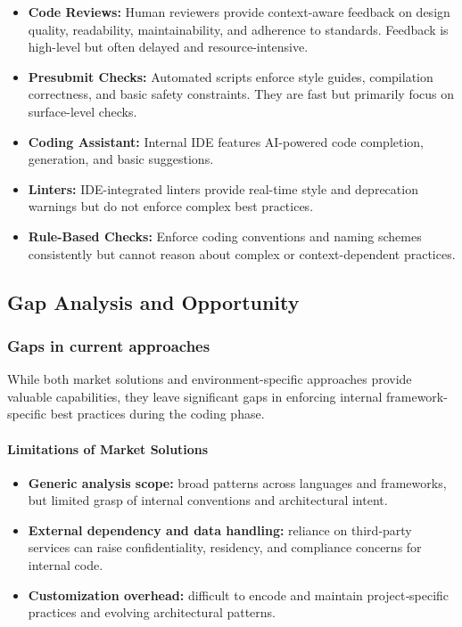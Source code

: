 \begin{spacing}{1.2}
\begin{itemize}
\item \textbf{Code Reviews:} Human reviewers provide context-aware feedback on design quality, readability, maintainability, and adherence to standards. Feedback is high-level but often delayed and resource-intensive.
\item \textbf{Presubmit Checks:} Automated scripts enforce style guides, compilation correctness, and basic safety constraints. They are fast but primarily focus on surface-level checks.
\item \textbf{Coding Assistant:} Internal IDE features AI-powered code completion, generation, and basic suggestions.
\item \textbf{Linters:} IDE-integrated linters provide real-time style and deprecation warnings but do not enforce complex best practices.
\item \textbf{Rule-Based Checks:} Enforce coding conventions and naming schemes consistently but cannot reason about complex or context-dependent practices.
\end{itemize}

\subsection{Gap Analysis and Opportunity}

\subsubsection{Gaps in current approaches}
While both market solutions and environment-specific approaches provide valuable capabilities, they leave significant gaps in enforcing internal framework-specific best practices during the coding phase.

\paragraph{Limitations of Market Solutions}

\begin{itemize}
\item \textbf{Generic analysis scope:} broad patterns across languages and frameworks, but limited grasp of internal conventions and architectural intent.
\item \textbf{External dependency and data handling:} reliance on third‑party services can raise confidentiality, residency, and compliance concerns for internal code.
\item \textbf{Customization overhead:} difficult to encode and maintain project‑specific practices and evolving architectural patterns.
\end{itemize}


\end{spacing}
